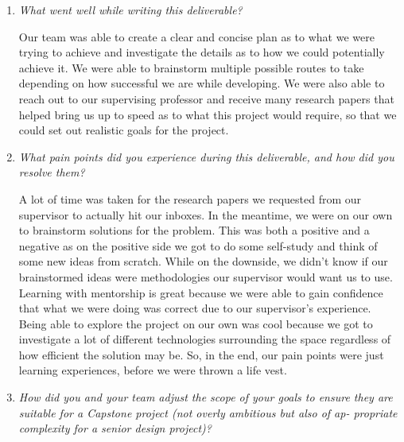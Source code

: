 \documentclass{article}
\begin{document}
\begin{enumerate}
  \item \textit{What went well while writing this deliverable?}

    Our team was able to create a clear and concise plan as to what
    we were trying to achieve and investigate the details as to how
    we could potentially achieve it. We were able to brainstorm
    multiple possible routes to take depending on how successful we
    are while developing. We were also able to reach out to our
    supervising professor and receive many research papers that
    helped bring us up to speed as to what this project would
    require, so that we could set out realistic goals for the project.
  \item \textit{What pain points did you experience during this
    deliverable, and how did you resolve them?}

    A lot of time was taken for the research papers we requested from
    our supervisor to actually hit our inboxes. In the meantime, we
    were on our own to brainstorm solutions for the problem. This was
    both a positive and a negative as on the positive side we got to
    do some self-study and think of some new ideas from scratch.
    While on the downside, we didn’t know if our brainstormed ideas
    were methodologies our supervisor would want us to use. Learning
    with mentorship is great because we were able to gain confidence
    that what we were doing was correct due to our supervisor’s
    experience. Being able to explore the project on our own was cool
    because we got to investigate a lot of different technologies
    surrounding the space regardless of how efficient the solution
    may be. So, in the end, our pain points were just learning
    experiences, before we were thrown a life vest.

  \item \textit{How did you and your team adjust the scope of your
      goals to ensure they
      are suitable for a Capstone project (not overly ambitious but also of ap-
    propriate complexity for a senior design project)?}


\end{enumerate}
\end{document}
